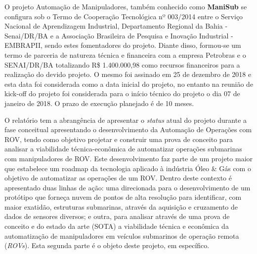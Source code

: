 \documentclass[
12pt,					%
openright,				%
twoside,				%
a4paper,				%
english,
brazil
]{ABNT/abntex2_report}
\begin{document}
	\frenchspacing
	\imprimircapa
	\imprimircatalografica
	\ABNTEXchapterfont\large\textbf{\execsummarytitlename}
	\begin{flushleft}
		\normalsize
		\justify
		\normalfont
		O projeto Automação de Manipuladores, também conhecido como \textbf{ManiSub} se configura sob o Termo de Cooperação Tecnológica nº 003/2014 entre o Serviço Nacional de Aprendizagem Industrial, Departamento Regional da Bahia - Senai/DR/BA e a Associação Brasileira de Pesquisa e Inovação Industrial - EMBRAPII, sendo estes fomentadores do projeto. Diante disso, formou-se um termo de parceria de natureza técnica e financeira com a empresa Petrobras e o SENAI/DR/BA totalizando R\$ 1.400.000,98 como recursos financeiros para a realização do devido projeto. O mesmo foi assinado em 25 de dezembro de 2018 e esta data foi considerada como a data inicial do projeto, no entanto na reunião de kick-off do projeto foi considerada para o início técnico do projeto o dia 07 de janeiro de 2018. O prazo de execução planejado é de 10 meses.
	\end{flushleft}
	\clearpage
	\ABNTEXchapterfont\large\textbf{\resumoatitlename}
	\begin{flushleft}
		\normalsize
		\justify
		\normalfont
		O relatório tem a abrangência de apresentar o \textit{status} atual do projeto durante a fase conceitual apresentando o desenvolvimento da	Automação de Operações com ROV, tendo como objetivo projetar e construir uma prova de conceito para analisar a viabilidade técnica-econômica de automatizar operações submarinas com manipuladores de ROV. Este desenvolvimento faz parte de um projeto maior que estabelece um roadmap da tecnologia aplicado à indústria Óleo \& Gás com o objetivo de automatizar as operações de um ROV. Dentro deste contexto é apresentado duas linhas de ação: uma direcionada para o desenvolvimento de um protótipo que forneça nuvem de pontos de alta resolução para identificar, com maior exatidão, estruturas submarinas, através da aquisição e cruzamento de dados de sensores diversos; e outra, para analisar através de uma prova de conceito e do estado da arte (SOTA) a viabilidade técnica e econômica da automatização de manipuladores em veículos submarinos de operação remota (\textit{\acs{ROV}s}). Esta segunda parte é o objeto deste projeto, em específico.
	\end{flushleft}
\end{document}
